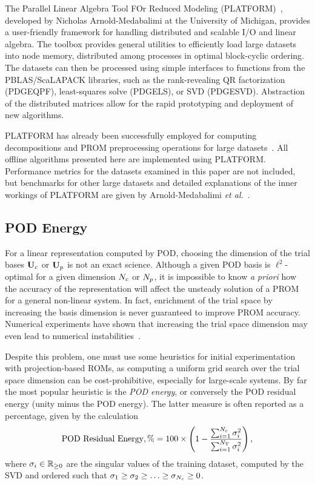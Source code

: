 The Parallel Linear Algebra Tool FOr Reduced Modeling (PLATFORM)~\cite{PLATFORM}, developed by Nicholas Arnold-Medabalimi at the University of Michigan, provides a user-friendly framework for handling distributed and scalable I/O and linear algebra. The toolbox provides general utilities to efficiently load large datasets into node memory, distributed among processes in optimal block-cyclic ordering. The datasets can then be processed using simple interfaces to functions from the PBLAS/ScaLAPACK libraries, such as the rank-revealing QR factorization (PDGEQPF), least-squares solve (PDGELS), or SVD (PDGESVD). Abstraction of the distributed matrices allow for the rapid prototyping and deployment of new algorithms.

PLATFORM has already been successfully employed for computing decompositions and PROM preprocessing operations for large datasets~\cite{Wentland2021,ArnoldMedabalimi2020,Harvazinski2020,Pan2021,ArnoldMedabalimi2022}. All offline algorithms presented here are implemented using PLATFORM. Performance metrics for the datasets examined in this paper are not included, but benchmarks for other large datasets and detailed explanations of the inner workings of PLATFORM are given by Arnold-Medabalimi \textit{et al.}~\cite{PLATFORM}.

\subsection{POD Energy}
%
For a linear representation computed by POD, choosing the dimension of the trial bases $\consTrial$ or $\primTrial$ is not an exact science. Although a given POD basis is $\ell^2$-optimal for a given dimension $N_c$ or $N_p$, it is impossible to know \textit{a priori} how the accuracy of the representation will affect the unsteady solution of a PROM for a general non-linear system. In fact, enrichment of the trial space by increasing the basis dimension is never guaranteed to improve PROM accuracy. Numerical experiments have shown that increasing the trial space dimension may even lead to numerical instabilities~\cite{Huang2022}.

Despite this problem, one must use some heuristics for initial experimentation with projection-based ROMs, as computing a uniform grid search over the trial space dimension can be cost-prohibitive, especially for large-scale systems. By far the most popular heuristic is the \textit{POD energy}, or conversely the POD residual energy (unity minus the POD energy). The latter measure is often reported as a percentage, given by the calculation
%
\begin{equation}\label{eq:podEnergyResidual}
    \text{POD Residual Energy}, \% = 100 \times \left( 1 - \frac{\sum_{i=1}^{N_c} \sigma_{i}^2}{\sum_{i=1}^{N_{\text{T}}} \sigma_{i}^2} \right),
\end{equation}
%
where $\sigma_{i} \in \mathbb{R}_{\ge 0}$ are the singular values of the training dataset, computed by the SVD and ordered such that $\sigma_1 \ge \sigma_2 \ge \hdots \ge \sigma_{N_c} \ge 0$.

